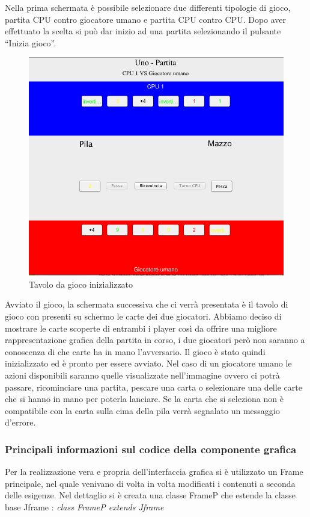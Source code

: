 		Nella prima schermata è possibile selezionare due differenti tipologie di gioco, partita CPU contro giocatore umano e partita CPU contro CPU. Dopo aver effettuato la scelta si può dar inizio ad una partita selezionando il pulsante “Inizia gioco”. 
		
		\begin{figure}[h]
			\centering
			\includegraphics[scale=0.6]{2.png}
			\caption{Tavolo da gioco inizializzato}
			\label{fig2}
		\end{figure}
		
		Avviato il gioco, la schermata successiva che ci verrà presentata è il tavolo di gioco con presenti su schermo le carte dei due giocatori. Abbiamo deciso di mostrare le carte scoperte di entrambi i player così da offrire una migliore rappresentazione grafica della partita in corso, i due giocatori però non saranno a conoscenza di che carte ha in mano l’avversario. Il gioco è stato quindi inizializzato ed è pronto per essere avviato. Nel caso di un giocatore umano le azioni disponibili saranno quelle visualizzate nell’immagine ovvero ci potrà passare, ricominciare una partita, pescare una carta o selezionare una delle carte che si hanno in mano per poterla lanciare. Se la carta che si seleziona non è compatibile con la carta sulla cima della pila verrà segnalato un messaggio d’errore.
		
		\subsubsection{Principali informazioni sul codice della componente grafica}
			Per la realizzazione vera e propria dell'interfaccia grafica si è utilizzato un Frame principale, nel quale venivano di volta in volta modificati i contenuti a seconda delle esigenze. Nel dettaglio si è creata una classe FrameP che estende la classe base Jframe : \textit{class FrameP extends Jframe}\\\\
			
